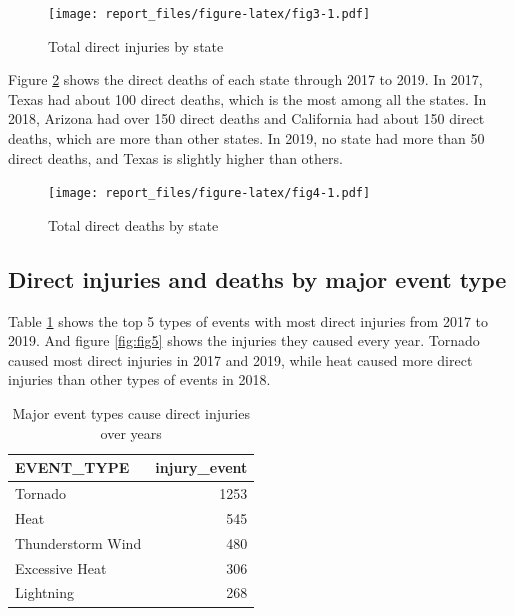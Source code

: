 \documentclass[
]{article}
\begin{document}
\begin{figure}
\centering
\texttt{[image: report\_files/figure-latex/fig3-1.pdf]}
\caption{\label{fig:fig3}Total direct injuries by state}
\end{figure}

\clearpage

Figure \ref{fig:fig4} shows the direct deaths of each state through 2017 to 2019. In 2017, Texas had about 100 direct deaths, which is the most among all the states. In 2018, Arizona had over 150 direct deaths and California had about 150 direct deaths, which are more than other states. In 2019, no state had more than 50 direct deaths, and Texas is slightly higher than others.

\begin{figure}
\centering
\texttt{[image: report\_files/figure-latex/fig4-1.pdf]}
\caption{\label{fig:fig4}Total direct deaths by state}
\end{figure}

\clearpage

\hypertarget{direct-injuries-and-deaths-by-major-event-type}{%
\subsection{Direct injuries and deaths by major event type}\label{direct-injuries-and-deaths-by-major-event-type}}

Table \ref{tab:tab1} shows the top 5 types of events with most direct injuries from 2017 to 2019. And figure \ref{fig:fig5} shows the injuries they caused every year. Tornado caused most direct injuries in 2017 and 2019, while heat caused more direct injuries than other types of events in 2018.

\begin{table}[!h]

\caption{\label{tab:tab1}Major event types cause direct injuries over years}
\centering
\begin{tabular}[t]{lr}
\toprule
EVENT\_TYPE & injury\_event\\
\midrule
\rowcolor{gray!6}  Tornado & 1253\\
Heat & 545\\
\rowcolor{gray!6}  Thunderstorm Wind & 480\\
Excessive Heat & 306\\
\rowcolor{gray!6}  Lightning & 268\\
\bottomrule
\end{tabular}
\end{table}
\end{document}
